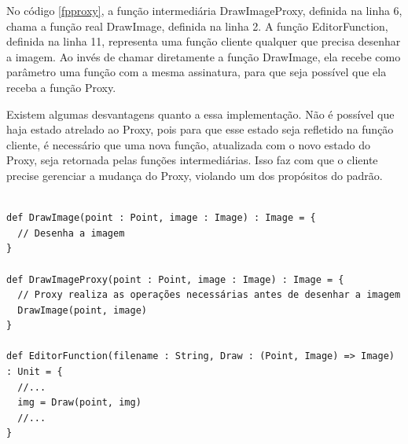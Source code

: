 No código \ref{fpproxy}, a função intermediária 
DrawImageProxy, definida na linha 6, chama a 
função real DrawImage, definida na linha 2. 
A função EditorFunction, definida na linha 11, 
representa uma função cliente qualquer que 
precisa desenhar a imagem. Ao invés de chamar 
diretamente a função DrawImage, ela recebe 
como parâmetro uma função com a mesma assinatura, 
para que seja possível que ela receba a função 
Proxy.

Existem algumas desvantagens quanto a essa 
implementação. Não é possível que haja 
estado atrelado ao Proxy, pois para que 
esse estado seja refletido na função 
cliente, é necessário que uma nova função, 
atualizada com o novo estado do Proxy, seja 
retornada pelas funções intermediárias. 
Isso faz com que o cliente precise gerenciar 
a mudança do Proxy, violando 
um dos propósitos do padrão. 

\begin{lstlisting}[caption={Proxy Funcional},label=fpproxy]
    
def DrawImage(point : Point, image : Image) : Image = {
  // Desenha a imagem
}

def DrawImageProxy(point : Point, image : Image) : Image = {
  // Proxy realiza as operações necessárias antes de desenhar a imagem
  DrawImage(point, image)
}

def EditorFunction(filename : String, Draw : (Point, Image) => Image) : Unit = {
  //...
  img = Draw(point, img)
  //...
}
    
\end{lstlisting}